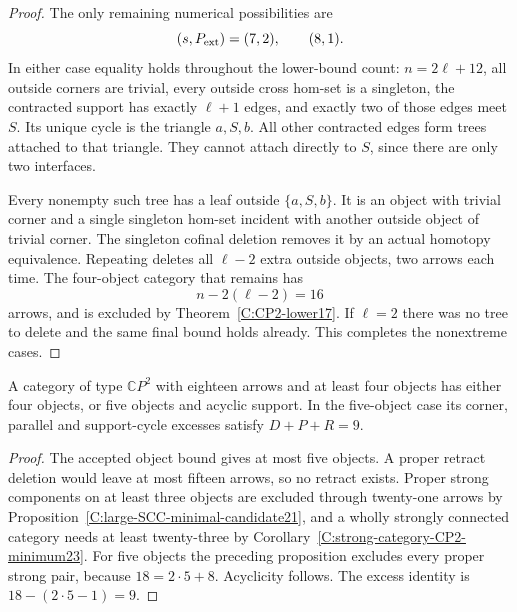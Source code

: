 \begin{proof}
The only remaining numerical possibilities are
\[
 (s,P_{\rm ext})=(7,2),\qquad(8,1).
\]
In either case equality holds throughout the lower-bound count:
$n=2\ell+12$, all outside corners are trivial, every outside
cross hom-set is a singleton, the contracted support has exactly
$\ell+1$ edges, and exactly two of those edges meet $S$.
Its unique cycle is the triangle $a,S,b$. All other contracted
edges form trees attached to that triangle. They cannot attach
directly to $S$, since there are only two interfaces.

Every nonempty such tree has a leaf outside $\{a,S,b\}$.
It is an object with trivial corner and a single singleton
hom-set incident with another outside object of trivial corner.
The singleton cofinal deletion removes it by an actual homotopy
equivalence. Repeating deletes all $\ell-2$ extra outside objects,
two arrows each time. The four-object category that remains has
\[
 n-2(\ell-2)=16
\]
arrows, and is excluded by Theorem~\ref{C:CP2-lower17}.
If $\ell=2$ there was no tree to delete and the same final bound
holds already. This completes the nonextreme cases.
\end{proof}

\begin{corollary}\label{C:eighteen-five-acyclic-scope}
A category of type $\mathbb CP^2$ with eighteen
arrows and at least four objects has either four objects, or
five objects and acyclic support. In the five-object case its
corner, parallel and support-cycle excesses satisfy
$D+P+R=9$.
\end{corollary}
\begin{proof}
The accepted object bound gives at most five objects. A proper
retract deletion would leave at most fifteen arrows, so no
retract exists. Proper strong components on at least three
objects are excluded through twenty-one arrows by
Proposition~\ref{C:large-SCC-minimal-candidate21}, and a wholly
strongly connected category needs at least twenty-three by
Corollary~\ref{C:strong-category-CP2-minimum23}.
For five objects the preceding proposition excludes every
proper strong pair, because $18=2\cdot5+8$. Acyclicity follows.
The excess identity is $18-(2\cdot5-1)=9$.
\end{proof}
